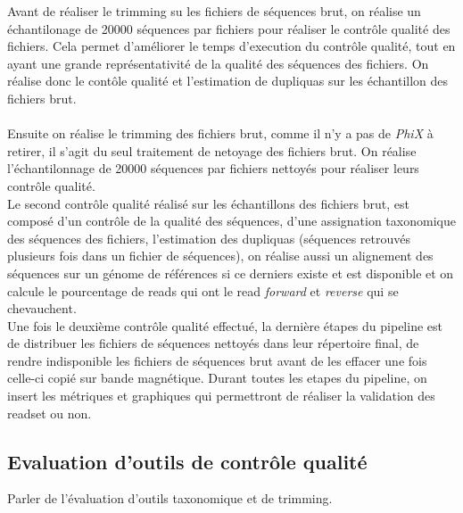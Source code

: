 Avant de réaliser le trimming su les fichiers de séquences brut, on réalise un échantilonage de 20000 séquences par fichiers pour réaliser le contrôle qualité des fichiers. Cela permet d'améliorer le temps d'execution du contrôle qualité, tout en ayant une grande représentativité de la qualité des séquences des fichiers. On réalise donc le contôle qualité et l'estimation de dupliquas sur les échantillon des fichiers brut.\\\\

Ensuite on réalise le trimming des fichiers brut, comme il n'y a pas de \emph{PhiX} à retirer, il s'agit du seul traitement de netoyage des fichiers brut. On réalise l'échantilonnage de 20000 séquences par fichiers nettoyés pour réaliser leurs contrôle qualité.\\

Le second contrôle qualité réalisé sur les échantillons des fichiers brut, est composé d'un contrôle de la qualité des séquences, d'une assignation taxonomique des séquences des fichiers, l'estimation des dupliquas (séquences retrouvés plusieurs fois dans un fichier de séquences), on réalise aussi un alignement des séquences sur un génome de références si ce derniers existe et est disponible et on calcule le pourcentage de reads qui ont le read \emph{forward} et \emph{reverse} qui se chevauchent.\\

Une fois le deuxième contrôle qualité effectué, la dernière étapes du pipeline est de distribuer les fichiers de séquences nettoyés dans leur répertoire final, de rendre indisponible les fichiers de séquences brut avant de les effacer une fois celle-ci copié sur bande magnétique. Durant toutes les etapes du pipeline, on insert les métriques et graphiques qui permettront de réaliser la validation des readset ou non.

\subsection{Evaluation d'outils de contrôle qualité}

Parler de l'évaluation d'outils taxonomique et de trimming.